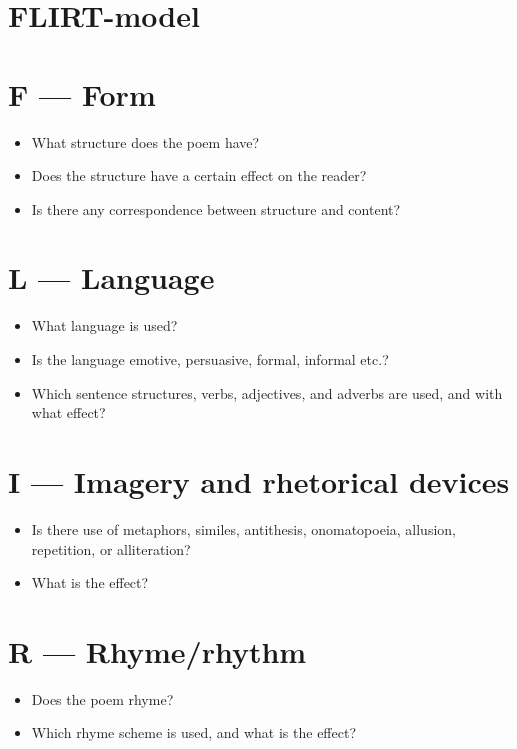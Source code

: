 \documentclass[11pt,a4paper,oneside]{book}
\begin{document}
\section*{FLIRT-model}

\section*{F — Form}

\begin{itemize}
\item What structure does the poem have?
\item Does the structure have a certain effect on the reader?
\item Is there any correspondence between structure and content?
\end{itemize}

\section*{L — Language}

\begin{itemize}
\item What language is used?
\item Is the language emotive, persuasive, formal, informal etc.?
\item Which sentence structures, verbs, adjectives, and adverbs are used, and with what effect?
\end{itemize}

\section*{I — Imagery and rhetorical devices}

\begin{itemize}
\item Is there use of metaphors, similes, antithesis, onomatopoeia, allusion, repetition, or alliteration?
\item What is the effect?
\end{itemize}

\section*{R — Rhyme/rhythm}

\begin{itemize}
\item Does the poem rhyme?
\item Which rhyme scheme is used, and what is the effect?
\end{itemize}
\end{document}
